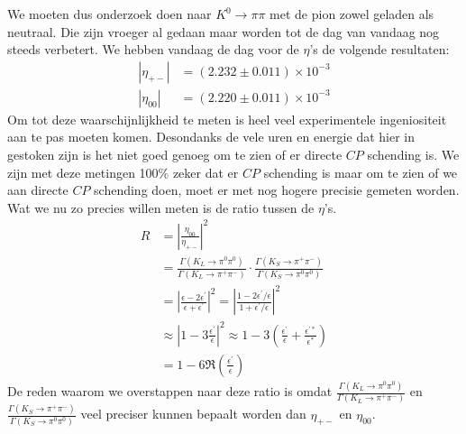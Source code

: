 \documentclass[../main.tex]{subfiles}
\begin{document}
We moeten dus onderzoek doen naar $K^{0} \rightarrow \pi \pi$ met de pion zowel geladen als neutraal. Die zijn vroeger al gedaan maar worden tot de dag van vandaag nog steeds verbetert. We hebben vandaag de dag voor de $\eta$'s de volgende resultaten:
\begin{equation}
    \begin{aligned}
        \label{eq:hedendaagse_eta}
        \left|\eta_{+-}\right| &=(2.232 \pm 0.011) \times 10^{-3} \\
        \left|\eta_{00}\right| &=(2.220 \pm 0.011) \times 10^{-3}
    \end{aligned}
\end{equation}
Om tot deze waarschijnlijkheid te meten is heel veel experimentele ingeniositeit aan te pas moeten komen. Desondanks de vele uren en energie dat hier in gestoken zijn is het niet goed genoeg om te zien of er directe $CP$ schending is. We zijn met deze metingen 100\% zeker dat er $CP$ schending is maar om te zien of we aan directe $CP$ schending doen, moet er met nog hogere precisie gemeten worden. Wat we nu zo precies willen meten is de ratio tussen de $\eta$'s.
\begin{equation}
    \begin{aligned}
        \label{eq:eta_ratio}
        R&=\left|\frac{\eta_{00}}{\eta_{+-}}\right|^{2}\\
         &=\frac{\Gamma\left(K_{L} \rightarrow \pi^{0} \pi^{0}\right)}{\Gamma\left(K_{L} \rightarrow \pi^{+} \pi^{-}\right)} \cdot \frac{\Gamma\left(K_{S} \rightarrow \pi^{+} \pi^{-}\right)}{\Gamma\left(K_{S} \rightarrow \pi^{0} \pi^{0}\right)} \\
         &=\left|\frac{\epsilon-2 \epsilon^{\prime}}{\epsilon+\epsilon^{\prime}}\right|^{2}=\left|\frac{1-2 \epsilon^{\prime} / \epsilon}{1+\epsilon^{\prime} / \epsilon}\right|^{2} \\
         &\approx\left|1-3 \frac{\epsilon^{\prime}}{\epsilon}\right|^{2} \approx 1-3\left(\frac{\epsilon^{\prime}}{\epsilon}+\frac{\epsilon^{\prime *}}{\epsilon^{*}}\right) \\
         &=1-6 \Re\left(\frac{\epsilon^{\prime}}{\epsilon}\right)
    \end{aligned}
\end{equation}
De reden waarom we overstappen naar deze ratio is omdat $\frac{\Gamma\left(K_{L} \rightarrow \pi^{0} \pi^{0}\right)}{\Gamma\left(K_{L} \rightarrow \pi^{+} \pi^{-}\right)}$ en $\frac{\Gamma\left(K_{S} \rightarrow \pi^{+} \pi^{-}\right)}{\Gamma\left(K_{S} \rightarrow \pi^{0} \pi^{0}\right)}$ veel preciser kunnen bepaalt worden dan $\eta_{+-}$ en $\eta_{00}$.\\
\end{document}
